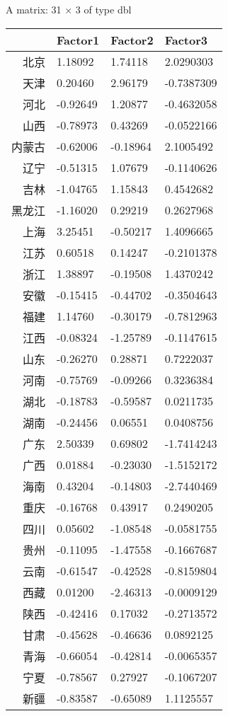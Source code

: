 \documentclass[UTF8,a4paper]{ctexart}
\begin{document}
    A matrix: 31 × 3 of type dbl
\begin{tabular}{r|lll}
  & Factor1 & Factor2 & Factor3\\
\hline
	北京 &  1.18092 &  1.74118 &  2.0290303\\
	天津 &  0.20460 &  2.96179 & -0.7387309\\
	河北 & -0.92649 &  1.20877 & -0.4632058\\
	山西 & -0.78973 &  0.43269 & -0.0522166\\
	内蒙古 & -0.62006 & -0.18964 &  2.1005492\\
	辽宁 & -0.51315 &  1.07679 & -0.1140626\\
	吉林 & -1.04765 &  1.15843 &  0.4542682\\
	黑龙江 & -1.16020 &  0.29219 &  0.2627968\\
	上海 &  3.25451 & -0.50217 &  1.4096665\\
	江苏 &  0.60518 &  0.14247 & -0.2101378\\
	浙江 &  1.38897 & -0.19508 &  1.4370242\\
	安徽 & -0.15415 & -0.44702 & -0.3504643\\
	福建 &  1.14760 & -0.30179 & -0.7812963\\
	江西 & -0.08324 & -1.25789 & -0.1147615\\
	山东 & -0.26270 &  0.28871 &  0.7222037\\
	河南 & -0.75769 & -0.09266 &  0.3236384\\
	湖北 & -0.18783 & -0.59587 &  0.0211735\\
	湖南 & -0.24456 &  0.06551 &  0.0408756\\
	广东 &  2.50339 &  0.69802 & -1.7414243\\
	广西 &  0.01884 & -0.23030 & -1.5152172\\
	海南 &  0.43204 & -0.14803 & -2.7440469\\
	重庆 & -0.16768 &  0.43917 &  0.2490205\\
	四川 &  0.05602 & -1.08548 & -0.0581755\\
	贵州 & -0.11095 & -1.47558 & -0.1667687\\
	云南 & -0.61547 & -0.42528 & -0.8159804\\
	西藏 &  0.01200 & -2.46313 & -0.0009129\\
	陕西 & -0.42416 &  0.17032 & -0.2713572\\
	甘肃 & -0.45628 & -0.46636 &  0.0892125\\
	青海 & -0.66054 & -0.42814 & -0.0065357\\
	宁夏 & -0.78567 &  0.27927 & -0.1067207\\
	新疆 & -0.83587 & -0.65089 &  1.1125557\\
\end{tabular}
\end{document}
